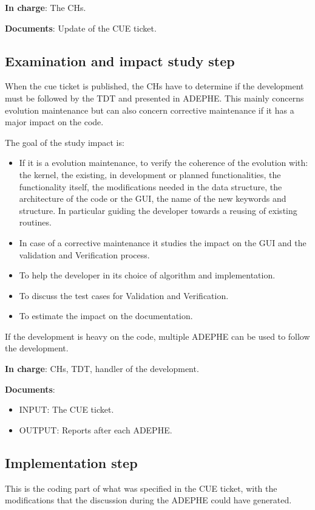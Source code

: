 \textbf{In charge}: The CHs.

\textbf{Documents}: Update of the CUE ticket.

\subsection{Examination and impact study step}

When the cue ticket is published, the CHs have to determine if the development
must be followed by the TDT and presented in ADEPHE. This mainly concerns
evolution maintenance but can also concern corrective maintenance if it has a
major impact on the code.

The goal of the study impact is:
\begin{itemize}
\item If it is a evolution maintenance, to verify the coherence of the
evolution with: the kernel, the existing, in development or planned
functionalities, the functionality itself, the modifications needed in the
data structure, the architecture of the code or the GUI, the name of the new
keywords and structure. In particular guiding the developer towards a reusing
of existing routines.
\item In case of a corrective maintenance it studies the impact on the GUI and
the validation and Verification process.
\item To help the developer in its choice of algorithm and implementation.
\item To discuss the test cases for Validation and Verification.
\item To estimate the impact on the documentation.
\end{itemize}

If the development is heavy on the code, multiple ADEPHE can be used to follow
the development.


\textbf{In charge}: CHs, TDT, handler of the development.

\textbf{Documents}: 
\begin{itemize}
\item INPUT: The CUE ticket.
\item OUTPUT: Reports after each ADEPHE.
\end{itemize}


\subsection{Implementation step}

This is the coding part of what was specified in the CUE ticket, with the
modifications that the discussion during the ADEPHE could have generated.

